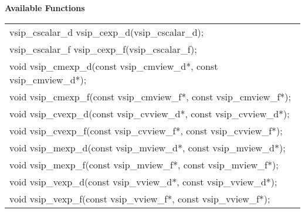 \\\cvsiplh
\\ \hspace*{.8cm} \vspace*{.1cm} \textbf{Available Functions }
\\ \hspace*{1.1cm} {
\ttfamily
\begin{tabular}[H]{l}
vsip\_cscalar\_d vsip\_cexp\_d(vsip\_cscalar\_d);\\
vsip\_cscalar\_f vsip\_cexp\_f(vsip\_cscalar\_f);\\
void vsip\_cmexp\_d(const vsip\_cmview\_d*, const vsip\_cmview\_d*);\\
void vsip\_cmexp\_f(const vsip\_cmview\_f*, const vsip\_cmview\_f*);\\
void vsip\_cvexp\_d(const vsip\_cvview\_d*, const vsip\_cvview\_d*);\\
void vsip\_cvexp\_f(const vsip\_cvview\_f*, const vsip\_cvview\_f*);\\
void vsip\_mexp\_d(const vsip\_mview\_d*, const vsip\_mview\_d*);\\
void vsip\_mexp\_f(const vsip\_mview\_f*, const vsip\_mview\_f*);\\
void vsip\_vexp\_d(const vsip\_vview\_d*, const vsip\_vview\_d*);\\
void vsip\_vexp\_f(const vsip\_vview\_f*, const vsip\_vview\_f*);\\
\end{tabular}
}
\\\pyjvsiph
{}
